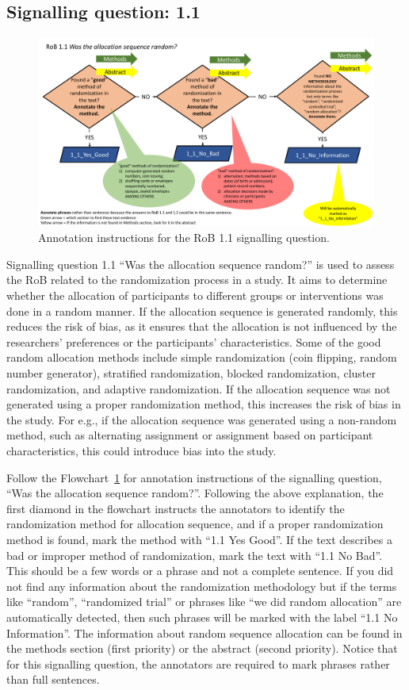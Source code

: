 \documentclass[sn-mathphys,Numbered]{sn-jnl}%
\begin{document}
\subsection*{Signalling question: 1.1}
%
%
%
%
\begin{figure}[hbt]
    \centering
    \includegraphics[width=\textwidth]{figures/1_1.pdf}
    \caption{Annotation instructions for the RoB 1.1 signalling question.}
    \label{fig:1_1}
\end{figure}
%
%
%
Signalling question 1.1 ``Was the allocation sequence random?'' is used to assess the RoB related to the randomization process in a study.
It aims to determine whether the allocation of participants to different groups or interventions was done in a random manner.
If the allocation sequence is generated randomly, this reduces the risk of bias, as it ensures that the allocation is not influenced by the researchers' preferences or the participants' characteristics.
Some of the good random allocation methods include simple randomization (coin flipping, random number generator), stratified randomization, blocked randomization, cluster randomization, and adaptive randomization.
If the allocation sequence was not generated using a proper randomization method, this increases the risk of bias in the study.
For e.g., if the allocation sequence was generated using a non-random method, such as alternating assignment or assignment based on participant characteristics, this could introduce bias into the study.

Follow the Flowchart~\ref{fig:1_1} for annotation instructions of the signalling question, ``Was the allocation sequence random?''.
Following the above explanation, the first diamond in the flowchart instructs the annotators to identify the randomization method for allocation sequence, and if a proper randomization method is found, mark the method with ``1.1 Yes Good''.
If the text describes a bad or improper method of randomization, mark the text with ``1.1 No Bad''.
This should be a few words or a phrase and not a complete sentence.
If you did not find any information about the randomization methodology but if the terms like ``random'', ``randomized trial'' or phrases like ``we did random allocation'' are automatically detected, then such phrases will be marked with the label ``1.1 No Information''.
The information about random sequence allocation can be found in the methods section (first priority) or the abstract (second priority).
Notice that for this signalling question, the annotators are required to mark phrases rather than full sentences.
%
%
%
\end{document}
